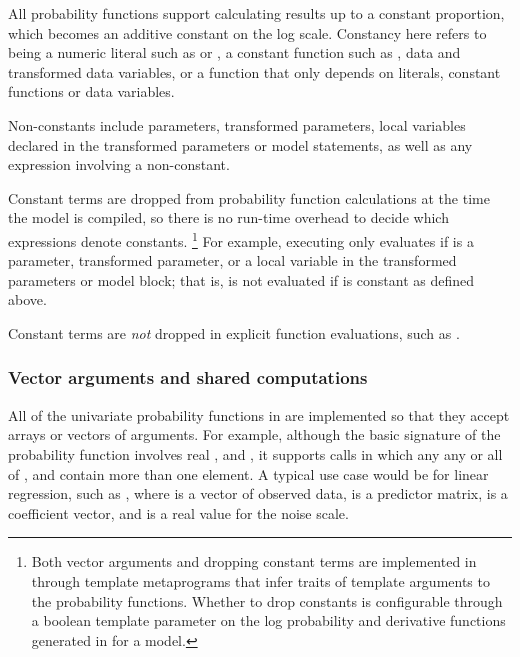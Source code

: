 \documentclass[article]{jss}
\begin{document}
All probability functions support calculating results up to a constant
proportion, which becomes an additive constant on the log scale.
Constancy here refers to being a numeric literal such as  or
, a constant function such as , data and
transformed data variables, or a function that only depends on
literals, constant functions or data variables.

Non-constants include parameters, transformed parameters, local
variables declared in the transformed parameters or model statements,
as well as any expression involving a non-constant.

Constant terms are dropped from probability function calculations at
the time the model is compiled, so there is no run-time overhead to
decide which expressions denote constants.%
%
\footnote{Both vector arguments and dropping constant terms are
  implemented in  through template metaprograms that
  infer traits of template arguments to the probability functions.
  Whether to drop constants is configurable through a boolean template
  parameter on the log probability and derivative functions generated
  in  for a model.}
%
For example, executing  only evaluates
 if  is a parameter, transformed
parameter, or a local variable in the transformed parameters or model
block; that is,  is not evaluated if  is
constant as defined above.  

Constant terms are {\it not} dropped in explicit function evaluations,
such as .

\subsubsection{Vector arguments and shared computations}

All of the univariate probability functions in  are
implemented so that they accept arrays or vectors of arguments.  For
example, although the basic signature of the probability function
 involves real ,  and
, it supports calls in which any any or all of ,
 and  contain more than one element. A typical
use case would be for linear regression, such as , where  is a vector of observed data, 
is a predictor matrix,  is a coefficient vector, and
 is a real value for the noise scale.
\end{document}
